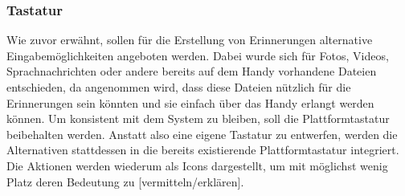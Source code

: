 \subsubsection{Tastatur}%
Wie zuvor erwähnt, sollen für die Erstellung von Erinnerungen alternative Eingabemöglichkeiten angeboten werden. Dabei wurde sich für Fotos, Videos, Sprachnachrichten oder andere bereits auf dem Handy vorhandene Dateien entschieden, da angenommen wird, dass diese Dateien nützlich für die Erinnerungen sein könnten und sie einfach über das Handy erlangt werden können.%
Um konsistent mit dem System zu bleiben, soll die Plattformtastatur beibehalten werden. Anstatt also eine eigene Tastatur zu entwerfen, werden die Alternativen stattdessen in die bereits existierende Plattformtastatur integriert.\newline%
Die Aktionen werden wiederum als Icons dargestellt, um mit möglichst wenig Platz deren Bedeutung zu [vermitteln/erklären].%
